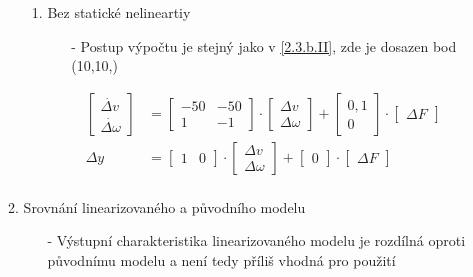 \documentclass{article}
\newcommand\mat[1]{\begin{bmatrix}#1\end{bmatrix}}
\begin{document}
\begin{enumerate}
\begin{enumerate}
\begin{enumerate}
                \item Bez statické nelineartiy
                    \begin{itemize}
                        \item[-] Postup výpočtu je stejný jako v \underline{\ref{2.3.b.II}}, zde je dosazen bod (10,10,)
                    \end{itemize}
                
                    \begin{align*}
                        \mat{\dot{\Delta v}\\ \dot{\Delta \omega}} &= \mat{-50 & -50\\ 1 & -1} \cdot \mat{\Delta v\\ \Delta \omega} + \mat{0,1\\ 0} \cdot \mat{\Delta F}\\
                        \Delta y &= \mat{1 & 0} \cdot \mat{\Delta v\\ \Delta \omega} + \mat{0} \cdot \mat{\Delta F}\\
                    \end{align*}
                    
            \end{enumerate}

        \item Srovnání linearizovaného a původního modelu
                \begin{itemize}
                    \item[-] Výstupní charakteristika linearizovaného modelu je rozdílná oproti původnímu modelu a není tedy příliš vhodná pro použití
                \end{itemize}
                

\end{enumerate}
\end{enumerate}
\end{document}
